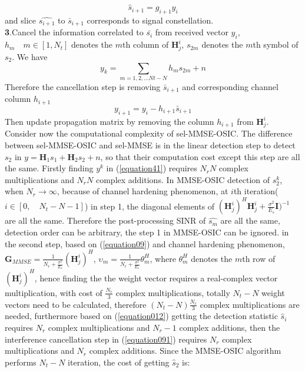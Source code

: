 \documentclass[12pt,a4paper,final]{article}
\begin{document}
\begin{spacing}{2.5}
\begin{equation}
\hat{s}_{i+1}=g_{i+1}y_{i}\label{equation012}
\end{equation}
and slice $\widehat{s_{i+1}}$ to $\bar{s}_{i+1}$ corresponds to signal constellation.\\
\textbf{3}.Cancel the information correlated to  $\bar{s_{i}}$ from received vector $y_{i}$, $h_{m}\quad m\in [1,N_{t}]$ denotes the $m$th column of $\mathbf{H}_{j}^{i}$, $s_{2m}$ denotes the $m$th symbol of $s_{2}$. We have
\begin{equation}
y_{k}=\sum_{m=1,2,\ldots Nt-N}h_{m}s_{2m}+n
\end{equation}
Therefore the cancellation step is removing $\bar{s}_{i+1}$ and corresponding channel column $h_{i+1}$
\begin{equation}
y_{i+1}=y_{i}-h_{i+1}\bar{s}_{i+1}\label{equation091}
\end{equation} 
Then update propagation matrix by removing the column $h_{i+1}$ from $\mathbf{H}_{j}^{i}$.\\
Consider now the computational complexity of sel-MMSE-OSIC. The difference between sel-MMSE-OSIC and sel-MMSE is in the linear detection step to detect $s_{2}$ in $y=\mathbf{H}_{1}s_{1}+\mathbf{H}_{2}s_{2}+n$, so that their computation cost except this step are all the same. Firstly finding $y^{k}$ in (\ref{equation41}) requires $N_{r}N$ complex multiplications and $N_{r}N$ complex additions. In MMSE-OSIC detection of $s_{2}^{k}$, when $N_{r}\to \infty$, because of channel hardening phenomenon, at $i$th iteration($i\in [0,\quad N_{t}-N-1]$) in step 1, the diagonal elements of $(\mathbf{H}^{i}_{j})^{H}\mathbf{H}^{i}_{j}+\frac{\sigma^{2}}{E_{s}}\mathbf{I})^{-1}$ are all the same. Therefore the post-processing SINR of $\hat{s_{m}}$ are all the same, detection order can be arbitrary, the step 1 in MMSE-OSIC can be ignored. in the second step, based on (\ref{equation09}) and channel hardening phenomenon, $\mathbf{G}_{MMSE}=\frac{1}{N_{r}+\frac{\sigma^{2}}{E_{s}}}(\mathbf{H}^{i}_{j})^{H}$, $\upsilon_{m}=\frac{1}{N_{r}+\frac{\sigma^{2}}{E_{s}}}\theta_{m}^{H}$, where $\theta_{m}^{H}$ denotes the $m$th row of $(\mathbf{H}^{i}_{j})^{H}$, hence finding the the weight vector requires a real-complex vector multiplication, with cost of $\frac{N_{r}}{3}$ complex multiplications, totally $N_{t}-N$ weight vectors need to be calculated, therefore $(N_{t}-N)\frac{N_{r}}{3}$ complex multiplications are needed, furthermore based on (\ref{equation012}) getting the detection statistic $\hat{s}_{i}$ requires $N_{r}$ complex multiplications and $N_{r}-1$ complex additions, then the interference cancellation step in (\ref{equation091}) requires $N_{r}$ complex multiplications and $N_{r}$ complex additions.  Since the MMSE-OSIC algorithm performs $N_{t}-N$ iteration, the cost of getting $\hat{s}_{2}$ is:

\end{spacing}
\end{document}
